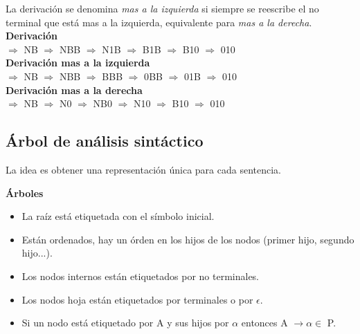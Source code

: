 \documentclass[\main/ApuntesPL.tex]{subfiles}
\begin{document}
      \bigskip
      \par
      La derivación se denomina \textit{mas a la izquierda} si siempre se reescribe el no terminal que está mas a la izquierda, equivalente para \textit{mas a la derecha}.\\
      \vspace{3mm}
      \hspace{5mm}\textbf{Derivación}\\
       $\Rightarrow$ {\color{red}N}B $\Rightarrow$ N{\color{red}B}B $\Rightarrow$ {\color{red}N}1B $\Rightarrow$ B1{\color{red}B} $\Rightarrow$ {\color{red}B}10 $\Rightarrow$ 010\\
      \vspace{3mm}
      \hspace{5mm}\textbf{Derivación mas a la izquierda}\\
       $\Rightarrow$ {\color{red}N}B $\Rightarrow$ {\color{red}N}BB $\Rightarrow$ {\color{red}B}BB $\Rightarrow$ 0{\color{red}B}B $\Rightarrow$ 01{\color{red}B} $\Rightarrow$ 010\\
      \vspace{3mm}
      \hspace{5mm}\textbf{Derivación mas a la derecha}\\
       $\Rightarrow$ N{\color{red}B} $\Rightarrow$ {\color{red}N}0 $\Rightarrow$ N{\color{red}B}0 $\Rightarrow$ {\color{red}N}10 $\Rightarrow$ {\color{red}B}10 $\Rightarrow$ 010

    \subsection{Árbol de análisis sintáctico}
      \par
      La idea es obtener una representación única para cada sentencia.

      \bigskip
      \par
      \textbf{Árboles}
      \begin{itemize}
        \item La raíz está etiquetada con el símbolo inicial.
        \item Están ordenados, hay un órden en los hijos de los nodos (primer hijo, segundo hijo...).
        \item Los nodos internos están etiquetados por no terminales.
        \item Los nodos hoja están etiquetados por terminales o por $\epsilon$.
        \item Si un nodo está etiquetado por A y sus hijos por $\alpha$ entonces A $\rightarrow \alpha \in$ P.
      \end{itemize}
\end{document}
